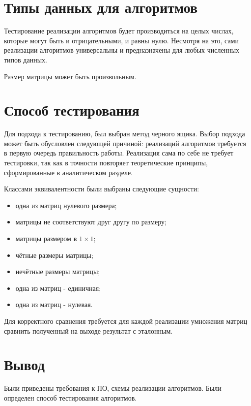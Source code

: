 \section{Типы данных для алгоритмов}
Тестирование реализации алгоритмов будет производиться на целых числах, 
которые могут быть и отрицательными, и равны нулю. Несмотря на это,
сами реализации алгоритмов универсальны и предназначены для любых численных типов данных.

Размер матрицы может быть произвольным.

\section{Способ тестирования}
Для подхода к тестированию, был выбран метод черного ящика.
Выбор подхода может быть обусловлен следующей причиной:
реализаций алгоритмов требуется в первую очередь правильность работы.
Реализация сама по себе не требует тестировки, так как в точности
повторяет теоретические принципы, сформированные в аналитическом
разделе.

Классами эквивалентности были выбраны следующие сущности:
\begin{itemize}
	\item одна из матриц нулевого размера;
	\item матрицы не соответствуют друг другу по размеру;
	\item матрицы размером в $1 \times 1$;
	\item чётные размеры матрицы;
	\item нечётные размеры матрицы;
	\item одна из матриц - единичная;
	\item одна из матриц - нулевая.
\end{itemize}

Для корректного сравнения требуется для каждой реализации умножения матриц
сравнить полученный на выходе результат с эталонным.

\section*{Вывод}
Были приведены требования к ПО, схемы реализации алгоритмов.
Были определен способ тестирования алгоритмов.